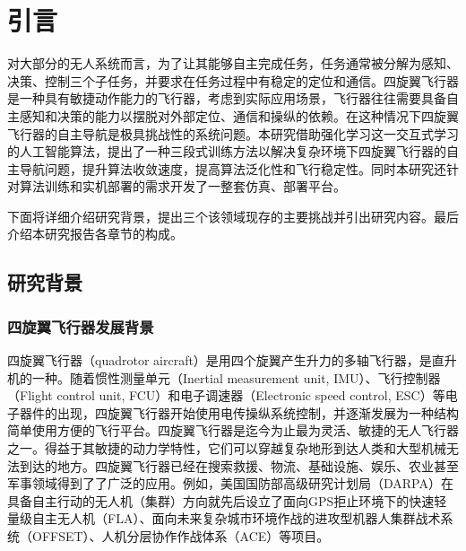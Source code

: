 
\chapter{引言}
\label{introduction}
对大部分的无人系统而言，为了让其能够自主完成任务，任务通常被分解为感知、决策、控制三个子任务，并要求在任务过程中有稳定的定位和通信。四旋翼飞行器是一种具有敏捷动作能力的飞行器，考虑到实际应用场景，飞行器往往需要具备自主感知和决策的能力以摆脱对外部定位、通信和操纵的依赖。在这种情况下四旋翼飞行器的自主导航是极具挑战性的系统问题。本研究借助强化学习这一交互式学习的人工智能算法，提出了一种三段式训练方法以解决复杂环境下四旋翼飞行器的自主导航问题，提升算法收敛速度，提高算法泛化性和飞行稳定性。同时本研究还针对算法训练和实机部署的需求开发了一整套仿真、部署平台。

下面将详细介绍研究背景，提出三个该领域现存的主要挑战并引出研究内容。最后介绍本研究报告各章节的构成。

\section{研究背景}
\label{background}
\subsection{四旋翼飞行器发展背景}
四旋翼飞行器（quadrotor aircraft）是用四个旋翼产生升力的多轴飞行器，是直升机的一种。随着惯性测量单元（Inertial measurement unit, IMU）、飞行控制器（Flight control unit, FCU）和电子调速器（Electronic speed control, ESC）等电子器件的出现，四旋翼飞行器开始使用电传操纵系统控制，并逐渐发展为一种结构简单使用方便的飞行平台。四旋翼飞行器是迄今为止最为灵活、敏捷的无人飞行器之一\cite{verbeke2018experimental}\cite{ackermann2020ai}。得益于其敏捷的动力学特性，它们可以穿越复杂地形到达人类和大型机械无法到达的地方。四旋翼飞行器已经在搜索救援、物流、基础设施、娱乐、农业甚至军事领域得到了了广泛的应用。例如，美国国防部高级研究计划局（DARPA）在具备自主行动的无人机（集群）方向就先后设立了面向GPS拒止环境下的快速轻量级自主无人机（FLA）、面向未来复杂城市环境作战的进攻型机器人集群战术系统（OFFSET）、人机分层协作作战体系（ACE）等项目\cite{darpa2023}。

